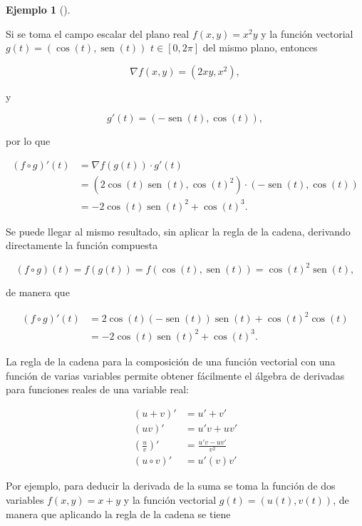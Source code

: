 \documentclass[
  a4paper,
]{scrreport}
\theoremstyle{plain}
\theoremstyle{definition}
\theoremstyle{plain}
\theoremstyle{plain}
\theoremstyle{definition}
\newtheorem{example}{Ejemplo}[chapter]
\theoremstyle{definition}
\theoremstyle{remark}
\begin{document}
\begin{example}[]\protect\hypertarget{exm-regla-cadena}{}\label{exm-regla-cadena}

Si se toma el campo escalar del plano real \(f(x,y)=x^2y\) y la función
vectorial \(g(t)=(\cos(t),\operatorname{sen}(t))\) \(t\in [0,2\pi]\) del
mismo plano, entonces

\[
\nabla f(x,y) = (2xy, x^2),
\]

y

\[
g'(t) = (-\operatorname{sen}(t), \cos(t)),
\]

por lo que

\begin{align*}
(f\circ g)'(t) 
&= \nabla f(g(t))\cdot g'(t) \\
&= (2\cos(t)\operatorname{sen}(t),\cos(t)^2)\cdot (-\operatorname{sen}(t),\cos(t)) \\
&= -2\cos(t)\operatorname{sen}(t)^2+\cos(t)^3.
\end{align*}

Se puede llegar al mismo resultado, sin aplicar la regla de la cadena,
derivando directamente la función compuesta

\[
(f\circ g)(t) = f(g(t)) = f(\cos(t), \operatorname{sen}(t)) = \cos(t)^2\operatorname{sen}(t),
\]

de manera que

\begin{align*}
(f\circ g)'(t) 
&= 2\cos(t)(-\operatorname{sen}(t))\operatorname{sen}(t)+\cos(t)^2 \cos(t)\\
&= -2\cos(t)\operatorname{sen}(t)^2+\cos(t)^3.
\end{align*}

\end{example}

La regla de la cadena para la composición de una función vectorial con
una función de varias variables permite obtener fácilmente el álgebra de
derivadas para funciones reales de una variable real:

\[
\begin{aligned}
(u+v)' &= u'+v'\\
(uv)' &= u'v+uv'\\
\left(\frac{u}{v}\right)' &= \frac{u'v-uv'}{v^2}\\
(u\circ v)' &= u'(v)v'
\end{aligned}
\]

Por ejemplo, para deducir la derivada de la suma se toma la función de
dos variables \(f(x,y)=x+y\) y la función vectorial
\(g(t)=(u(t),v(t))\), de manera que aplicando la regla de la cadena se
tiene
\end{document}
